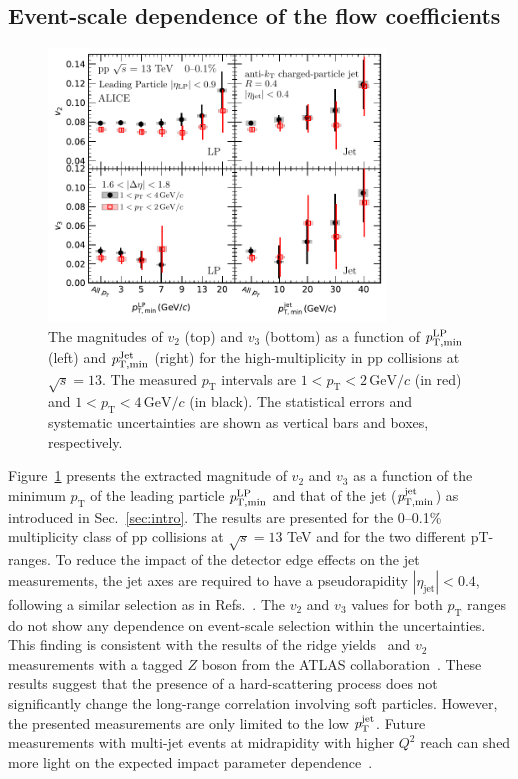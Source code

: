 \subsection{Event-scale dependence of the flow coefficients}
\begin{figure}[h!]
	\centering
	\hspace{-3em}\includegraphics[width=0.8\textwidth]{figures/FIG6_vn_LP.pdf}
	\caption{The magnitudes of $v_2$ (top) and $v_3$ (bottom) as a function of $\it{p}^{\rm{LP}}_{\rm{T,min}}$ (left) and $\it{p}^{\rm{Jet}}_{\rm{T,min}}$ (right) for the high-multiplicity in pp collisions at $\sqrt{s}=13$. The measured $p_{\mathrm{T}}$ intervals are $1<p_{\mathrm{T}}<2\,\mathrm{GeV}/c$ (in red) and $1<p_{\mathrm{T}}<4\,\mathrm{GeV}/c$ (in black). The statistical errors and systematic uncertainties are shown as vertical bars and boxes, respectively.}
	\label{fig:LPjet23}
\end{figure}    

Figure~\ref{fig:LPjet23} presents the extracted magnitude of $v_2$ and $v_3$ as a function of the minimum $p_\mathrm{T}$ of the leading particle $\it{p}^{\rm{LP}}_{\rm{T,min}}$ and that of the jet ($\it{p}^{\rm{jet}}_{\rm{T,min}}$) as introduced in Sec.~\ref{sec:intro}. 
The results are presented for the 0–0.1\% multiplicity class of pp collisions at $\sqrt{s}= 13$ TeV and for the two different pT-ranges.
To reduce the impact of the detector edge effects on the jet measurements, the jet axes are required to have a pseudorapidity $|\eta_\mathrm{jet}|<0.4$, following a similar selection as in Refs.~\cite{CDF:2001onq, ATLAS:2014riz, CMS:2015jdl}. The $v_2$ and $v_3$ values for both $p_\mathrm{T}$ ranges do not show any dependence on event-scale selection within the uncertainties. This finding is consistent with the results of the ridge yields~\cite{ALICE:2021nir} and $v_{2}$ measurements with a tagged $Z$ boson from the ATLAS collaboration~\cite{Aaboud:2019mcw}. These results suggest that the presence of a hard-scattering process does not significantly change the long-range correlation involving soft particles.
However, the presented measurements are only limited to the low $\it{p}^{\rm{jet}}_{\rm{T}}$. Future measurements with multi-jet events at midrapidity with higher $Q^2$ reach can shed more light on the expected impact parameter dependence~\cite{Sjostrand:1986ep,Frankfurt:2003td,Frankfurt:2010ea}.

